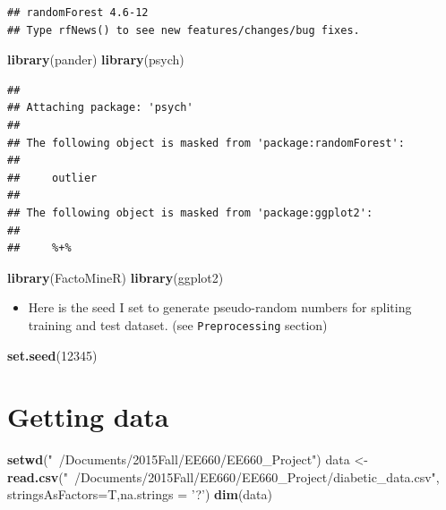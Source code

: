 \documentclass[]{article}
\newenvironment{Shaded}{\begin{snugshade}}{\end{snugshade}}
\newcommand{\KeywordTok}[1]{\textcolor[rgb]{0.13,0.29,0.53}{\textbf{{#1}}}}
\newcommand{\DataTypeTok}[1]{\textcolor[rgb]{0.13,0.29,0.53}{{#1}}}
\newcommand{\DecValTok}[1]{\textcolor[rgb]{0.00,0.00,0.81}{{#1}}}
\newcommand{\StringTok}[1]{\textcolor[rgb]{0.31,0.60,0.02}{{#1}}}
\newcommand{\NormalTok}[1]{{#1}}
\begin{document}
\begin{verbatim}
## randomForest 4.6-12
## Type rfNews() to see new features/changes/bug fixes.
\end{verbatim}

\begin{Shaded}
\begin{Highlighting}[]
\KeywordTok{library}\NormalTok{(pander)}
\KeywordTok{library}\NormalTok{(psych)}
\end{Highlighting}
\end{Shaded}

\begin{verbatim}
## 
## Attaching package: 'psych'
## 
## The following object is masked from 'package:randomForest':
## 
##     outlier
## 
## The following object is masked from 'package:ggplot2':
## 
##     %+%
\end{verbatim}

\begin{Shaded}
\begin{Highlighting}[]
\KeywordTok{library}\NormalTok{(FactoMineR)}
\KeywordTok{library}\NormalTok{(ggplot2)}
\end{Highlighting}
\end{Shaded}

\begin{itemize}
\itemsep1pt\parskip0pt
\item
  Here is the seed I set to generate pseudo-random numbers for spliting
  training and test dataset. (see \texttt{Preprocessing} section)
\end{itemize}

\begin{Shaded}
\begin{Highlighting}[]
\KeywordTok{set.seed}\NormalTok{(}\DecValTok{12345}\NormalTok{)}
\end{Highlighting}
\end{Shaded}

\section{Getting data}\label{getting-data}

\begin{Shaded}
\begin{Highlighting}[]
\KeywordTok{setwd}\NormalTok{(}\StringTok{"~/Documents/2015Fall/EE660/EE660_Project"}\NormalTok{)}
\NormalTok{data <-}\StringTok{ }\KeywordTok{read.csv}\NormalTok{(}\StringTok{"~/Documents/2015Fall/EE660/EE660_Project/diabetic_data.csv"}\NormalTok{,}
                 \DataTypeTok{stringsAsFactors=}\NormalTok{T,}\DataTypeTok{na.strings =} \StringTok{'?'}\NormalTok{)}
\KeywordTok{dim}\NormalTok{(data)}
\end{Highlighting}
\end{Shaded}
\end{document}

